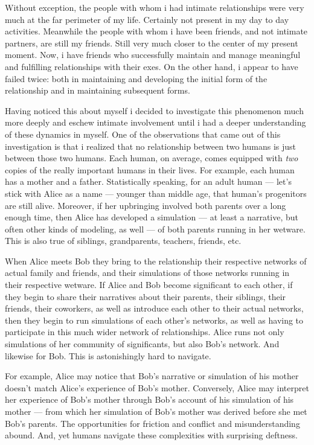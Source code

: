Without exception, the people with whom i had intimate relationships were very much at the far perimeter of my life. Certainly not present in my day to day activities. Meanwhile the people with whom i have been friends, and not intimate partners, are still my friends. Still very much closer to the center of my present moment. Now, i have friends who successfully maintain and manage meaningful and fulfilling relationships with their exes. On the other hand, i appear to have failed twice: both in maintaining and developing the initial form of the relationship and in maintaining subsequent forms.

Having noticed this about myself i decided to investigate this phenomenon much more deeply and eschew intimate involvement until i had a deeper understanding of these dynamics in myself. One of the observations that came out of this investigation is that i realized that no relationship between two humans is just between those two humans. Each human, on average, comes equipped with \emph{two} copies of the really important humans in their lives. For example, each human has a mother and a father. Statistically speaking, for an adult human --- let's stick with Alice as a name --- younger than middle age, that human's progenitors are still alive. Moreover, if her upbringing involved both parents over a long enough time, then Alice has developed a simulation --- at least a narrative, but often other kinds of modeling, as well --- of both parents running in her wetware. This is also true of siblings, grandparents, teachers, friends, etc.

When Alice meets Bob they bring to the relationship their respective networks of actual family and friends, and their simulations of those networks running in their respective wetware. If Alice and Bob become significant to each other, if they begin to share their narratives about their parents, their siblings, their friends, their coworkers, as well as introduce each other to their actual networks, then they begin to run simulations of each other's networks, as well as having to participate in this much wider network of relationships. Alice runs not only simulations of her community of significants, but also Bob's network. And likewise for Bob. This is astonishingly hard to navigate.

For example, Alice may notice that Bob's narrative or simulation of his mother doesn't match Alice's experience of Bob's mother. Conversely, Alice may interpret her experience of Bob's mother through Bob's account of his simulation of his mother --- from which her simulation of Bob's mother was derived before she met Bob's parents. The opportunities for friction and conflict and misunderstanding abound. And, yet humans navigate these complexities with surprising deftness.

